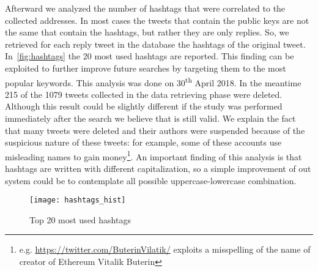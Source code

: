 Afterward we analyzed the number of hashtags that were
correlated to the collected addresses.
In most cases the tweets that
contain the public keys are not the same that contain the hashtags, but rather
they are only replies.
So, we retrieved for each reply tweet in the database the hashtags of the
original tweet.
In~\autoref{fig:hashtags} the 20 most used hashtags are reported.
This finding can be exploited to further improve future searches by targeting
them to the most popular keywords.
This analysis was done on 30\textsuperscript{th} April 2018. In the
meantime 215 of the 1079 tweets collected in the data retrieving phase were
deleted. Although
this result could be slightly different if the study was performed immediately
after the search we believe that is still valid. 
We explain the fact
that many tweets were deleted and their authors were suspended because of
the suspicious nature of these tweets: for example, some of 
these accounts use misleading names to gain
money\footnote{e.g. \url{https://twitter.com/ButerinVilatik/} exploits a
misspelling of the name of creator of Ethereum Vitalik Buterin}.
An important finding of this analysis is that hashtags are written with
different capitalization, so a simple improvement of out system could be to
contemplate all possible uppercase-lowercase combination.

\begin{figure}
\centering
\texttt{[image: hashtags\_hist]}
\caption{Top 20 most used hashtags}
\label{fig:hashtags}
\end{figure}